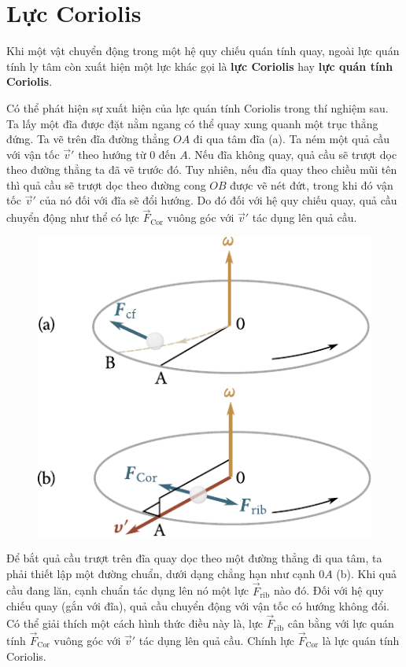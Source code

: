 \section{Lực Coriolis}\label{sec:4_3}

Khi một vật chuyển động trong một hệ quy chiếu quán tính quay, ngoài lực quán tính ly tâm còn xuất hiện một lực khác gọi là \textbf{lực Coriolis} hay \textbf{lực quán tính Coriolis}.

Có thể phát hiện sự xuất hiện của lực quán tính Coriolis trong thí nghiệm sau. Ta lấy một đĩa được đặt nằm ngang có thể quay xung quanh một trục thẳng đứng. Ta vẽ trên đĩa đường thẳng $OA$ đi qua tâm đĩa (a). Ta ném một quả cầu với vận tốc $\vec{v}'$ theo hướng từ $0$ đến $A$. Nếu đĩa không quay, quả cầu sẽ trượt dọc theo đường thẳng ta đã vẽ trước đó. Tuy nhiên, nếu đĩa quay theo chiều mũi tên thì quả cầu sẽ trượt dọc theo đường cong $OB$ được vẽ nét đứt, trong khi đó vận tốc $\vec{v}'$ của nó đối với đĩa sẽ đổi hướng. Do đó đối với hệ quy chiếu quay, quả cầu chuyển động như thể có lực $\vec{F}_{\text{Cor}}$ vuông góc với $\vec{v}'$ tác dụng lên quả cầu.

\begin{figure}[!htb]
	\begin{center}
		\includegraphics[scale=1]{figures/ch_04/fig_4_6.pdf}
		\caption[]{}
		\label{fig:4_6}
	\end{center}
\end{figure}

Để bắt quả cầu trượt trên đĩa quay dọc theo một đường thẳng đi qua tâm, ta phải thiết lập một đường chuẩn, dưới dạng chẳng hạn như cạnh $0A$ (b). Khi quả cầu đang lăn, cạnh chuẩn tác dụng lên nó một lực $\vec{F}_{\text{rib}}$ nào đó. Đối với hệ quy chiếu quay (gắn với đĩa), quả cầu chuyển động với vận tốc có hướng không đổi. Có thể giải thích một cách hình thức điều này là, lực  $\vec{F}_{\text{rib}}$ cân bằng với lực quán tính $\vec{F}_{\text{Cor}}$ vuông góc với $\vec{v}'$ tác dụng lên quả cầu. Chính lực $\vec{F}_{\text{Cor}}$ là lực quán tính Coriolis.

